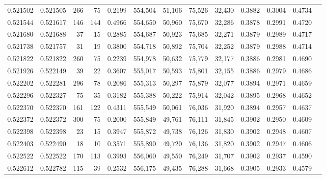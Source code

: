 \begin{tabular}{rrrrrrrrrrrrr}
0.521502 & 0.521505 &   266 &    75 &                                     0.2199 & 554,504 &  51,106 &  75,526 &  32,430 & 0.3882 & 0.3004 & 0.4734 \\
0.521544 & 0.521617 &   146 &   144 &                                     0.4966 & 554,650 &  50,960 &  75,670 &  32,286 & 0.3878 & 0.2991 & 0.4720 \\
0.521680 & 0.521688 &    37 &    15 &                                     0.2885 & 554,687 &  50,923 &  75,685 &  32,271 & 0.3879 & 0.2989 & 0.4717 \\
0.521738 & 0.521757 &    31 &    19 &                                     0.3800 & 554,718 &  50,892 &  75,704 &  32,252 & 0.3879 & 0.2988 & 0.4714 \\
0.521822 & 0.521822 &   260 &    75 &                                     0.2239 & 554,978 &  50,632 &  75,779 &  32,177 & 0.3886 & 0.2981 & 0.4690 \\
0.521926 & 0.522149 &    39 &    22 &                                     0.3607 & 555,017 &  50,593 &  75,801 &  32,155 & 0.3886 & 0.2979 & 0.4686 \\
0.522202 & 0.522281 &   296 &    78 &                                     0.2086 & 555,313 &  50,297 &  75,879 &  32,077 & 0.3894 & 0.2971 & 0.4659 \\
0.522296 & 0.522327 &    75 &    35 &                                     0.3182 & 555,388 &  50,222 &  75,914 &  32,042 & 0.3895 & 0.2968 & 0.4652 \\
0.522370 & 0.522370 &   161 &   122 &                                     0.4311 & 555,549 &  50,061 &  76,036 &  31,920 & 0.3894 & 0.2957 & 0.4637 \\
0.522372 & 0.522372 &   300 &    75 &                                     0.2000 & 555,849 &  49,761 &  76,111 &  31,845 & 0.3902 & 0.2950 & 0.4609 \\
0.522398 & 0.522398 &    23 &    15 &                                     0.3947 & 555,872 &  49,738 &  76,126 &  31,830 & 0.3902 & 0.2948 & 0.4607 \\
0.522403 & 0.522490 &    18 &    10 &                                     0.3571 & 555,890 &  49,720 &  76,136 &  31,820 & 0.3902 & 0.2947 & 0.4606 \\
0.522522 & 0.522522 &   170 &   113 &                                     0.3993 & 556,060 &  49,550 &  76,249 &  31,707 & 0.3902 & 0.2937 & 0.4590 \\
0.522612 & 0.522782 &   115 &    39 &                                     0.2532 & 556,175 &  49,435 &  76,288 &  31,668 & 0.3905 & 0.2933 & 0.4579 \\

\end{tabular}
